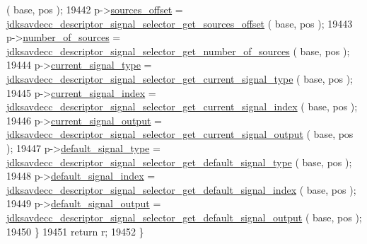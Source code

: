 \begin{DoxyCode}
      ( base, pos );
19442         p->\hyperlink{structjdksavdecc__descriptor__signal__selector_ac9ce4e1b642e6654d49504898dbe738d}{sources\_offset} = 
      \hyperlink{group__descriptor__signal__selector_gaad1dd192714ec97fa014cc58d9daa751}{jdksavdecc\_descriptor\_signal\_selector\_get\_sources\_offset}
      ( base, pos );
19443         p->\hyperlink{structjdksavdecc__descriptor__signal__selector_a1af3a7f3729937d5da218737ba5b2483}{number\_of\_sources} = 
      \hyperlink{group__descriptor__signal__selector_gae7313a6d5229e6cfb3e6ba762406345c}{jdksavdecc\_descriptor\_signal\_selector\_get\_number\_of\_sources}
      ( base, pos );
19444         p->\hyperlink{structjdksavdecc__descriptor__signal__selector_a408475bffcd6570a3f9765640a6295fc}{current\_signal\_type} = 
      \hyperlink{group__descriptor__signal__selector_ga0f44d9066448c3a92a8023ad16be049d}{jdksavdecc\_descriptor\_signal\_selector\_get\_current\_signal\_type}
      ( base, pos );
19445         p->\hyperlink{structjdksavdecc__descriptor__signal__selector_a4212c1f7128d45c03128f227a8c006ea}{current\_signal\_index} = 
      \hyperlink{group__descriptor__signal__selector_ga5da66074e86891063e85fca5e7ed6d19}{jdksavdecc\_descriptor\_signal\_selector\_get\_current\_signal\_index}
      ( base, pos );
19446         p->\hyperlink{structjdksavdecc__descriptor__signal__selector_a5dc47fe67773594e0c97e7002f30dcdf}{current\_signal\_output} = 
      \hyperlink{group__descriptor__signal__selector_ga9ebddda11cb06f75f581739a793a1fef}{jdksavdecc\_descriptor\_signal\_selector\_get\_current\_signal\_output}
      ( base, pos );
19447         p->\hyperlink{structjdksavdecc__descriptor__signal__selector_a18ece2e97b4c992cddf6d79fea5de625}{default\_signal\_type} = 
      \hyperlink{group__descriptor__signal__selector_ga59de783027369f5d6090744afc83d0cc}{jdksavdecc\_descriptor\_signal\_selector\_get\_default\_signal\_type}
      ( base, pos );
19448         p->\hyperlink{structjdksavdecc__descriptor__signal__selector_ab4a3878d07f400df446a3b86c017d70c}{default\_signal\_index} = 
      \hyperlink{group__descriptor__signal__selector_gaec1150cecac330db769ac93f28b7f111}{jdksavdecc\_descriptor\_signal\_selector\_get\_default\_signal\_index}
      ( base, pos );
19449         p->\hyperlink{structjdksavdecc__descriptor__signal__selector_aec79d305cd36498cff43ccd72909c13f}{default\_signal\_output} = 
      \hyperlink{group__descriptor__signal__selector_gafb6b6953b03fce581a01638243f4ec42}{jdksavdecc\_descriptor\_signal\_selector\_get\_default\_signal\_output}
      ( base, pos );
19450     \}
19451     \textcolor{keywordflow}{return} r;
19452 \}
\end{DoxyCode}


